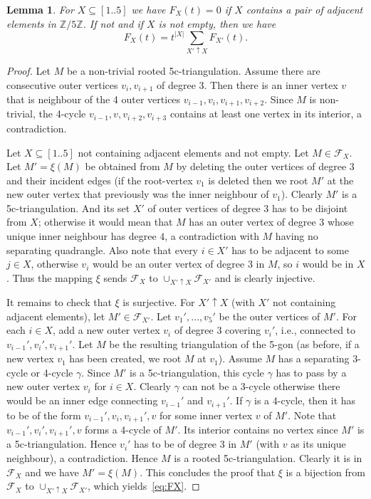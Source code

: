 \documentclass[letter]{amsart}
\numberwithin{theo}{section}
\newtheorem{lemma}[theo]{Lemma}
\theoremstyle{remark}
\def\cF{\mathcal{F}}
\begin{document}
\begin{lemma}\label{lem:FX}
For $X\subseteq[1..5]$ we have $F_X(t)=0$ if $X$ contains a pair of adjacent elements in $\mathbb{Z}/5\mathbb{Z}$. If not and if $X$ is not empty, then we have
\begin{equation}\label{eq:FX}
F_X(t)=t^{|X|}\sum_{X'\uparrow X}F_{X'}(t).
\end{equation}
\end{lemma}  
\begin{proof}
Let $M$ be a non-trivial rooted 5c-triangulation. Assume there are consecutive outer vertices $v_i,v_{i+1}$ of degree $3$. Then there is an inner vertex $v$ that is neighbour of the 4 outer vertices $v_{i-1},v_i,v_{i+1},v_{i+2}$. Since $M$ is non-trivial, the 4-cycle $v_{i-1},v,v_{i+2},v_{i+3}$ contains at least one vertex in its interior, a contradiction. 

Let $X\subseteq[1..5]$ not containing adjacent elements and not empty. Let $M\in\cF_X$. 
Let $M'=\xi(M)$ be obtained from $M$ by deleting the outer vertices of degree $3$ and their incident edges (if the root-vertex $v_1$ is deleted then we root $M'$ at the new outer vertex that previously was the inner neighbour of $v_1$). Clearly $M'$ is a 5c-triangulation. And its set $X'$ of outer vertices of degree $3$ has to be disjoint from $X$; otherwise it would mean that $M$ has an outer vertex of degree $3$ whose unique inner neighbour has degree $4$, a contradiction with $M$ having no separating quadrangle. Also note that every $i\in X'$ has to be adjacent to some $j\in X$, otherwise $v_i$ would be an outer vertex of degree $3$ in $M$, so $i$ would be in $X$. 
Thus the mapping $\xi$ sends  $\cF_X$ to $\cup_{X'\uparrow X}\cF_{X'}$ and is clearly injective. 

It remains to check that $\xi$ is surjective. For $X'\uparrow X$ (with $X'$ not containing adjacent elements), let $M'\in\cF_{X'}$. Let $v_1',\ldots,v_5'$ be the outer vertices of $M'$. For each $i\in X$, add a new outer vertex $v_i$ of degree $3$ covering $v_i'$, i.e., connected to $v_{i-1}',v_i',v_{i+1}'$. Let $M$ be the resulting triangulation of the 5-gon (as before, if a new vertex $v_1$ has been created, we root $M$ at $v_1$). Assume $M$ has a separating 3-cycle or 4-cycle $\gamma$. Since $M'$ is a 5c-triangulation, this cycle $\gamma$ has to pass by a new outer vertex $v_i$ for $i\in X$. Clearly $\gamma$ can not be a 3-cycle otherwise there would be an inner edge connecting $v_{i-1}'$ and $v_{i+1}'$. If $\gamma$ is a 4-cycle, then it has to be of the form $v_{i-1}',v_i,v_{i+1}',v$ for some inner vertex $v$ of $M'$. Note that $v_{i-1}',v_i',v_{i+1}',v$ forms a 4-cycle of $M'$. Its interior contains no vertex since $M'$ is a 5c-triangulation. Hence $v_i'$ has to be of degree $3$ in $M'$ (with $v$ as its unique neighbour), a contradiction. Hence $M$ is a rooted 5c-triangulation. Clearly it is in $\cF_X$ and we have $M'=\xi(M)$.   
This concludes the proof that $\xi$ is a bijection from $\cF_X$ to $\cup_{X'\uparrow X}\cF_{X'}$, which yields~\eqref{eq:FX}. 
\end{proof}
\end{document}
